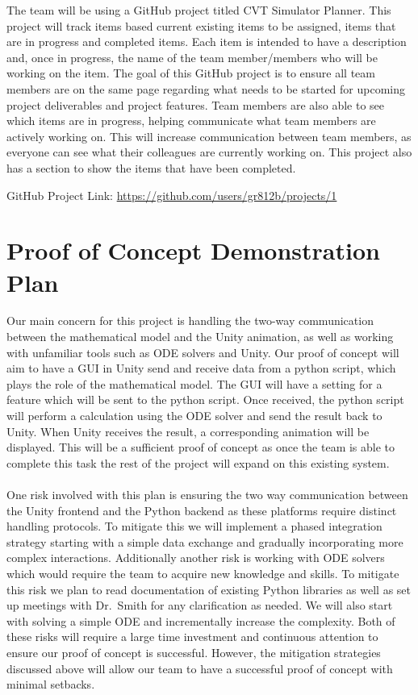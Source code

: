 \documentclass{article}
\begin{document}
The team will be using a GitHub project titled CVT Simulator Planner. 
This project will track items based current existing items to be assigned, items that are in progress and completed items. Each item is intended to have a description and, once in progress, the name of the team member/members who will be working on the item.
The goal of this GitHub project is to ensure all team members are on the same page regarding what needs to be started for upcoming project deliverables and project features. 
Team members are also able to see which items are in progress, helping communicate what team members are actively working on.
This will increase communication between team members, as everyone can see what their colleagues are currently working on.
This project also has a section to show the items that have been completed. 

\noindent GitHub Project Link: \url{https://github.com/users/gr812b/projects/1}

\section{Proof of Concept Demonstration Plan}

Our main concern for this project is handling the two-way communication between the mathematical model and the Unity animation, as well as working with unfamiliar tools such as ODE solvers and Unity.
Our proof of concept will aim to have a GUI in Unity send and receive data from a python script, which plays the role of the mathematical model.
The GUI will have a setting for a feature which will be sent to the python script. 
Once received, the python script will perform a calculation using the ODE solver and send the result back to Unity.
When Unity receives the result, a corresponding animation will be displayed.
This will be a sufficient proof of concept as once the team is able to complete this task the rest of the project will expand on this existing system. 
\\\\
\noindent One risk involved with this plan is ensuring the two way communication between the Unity frontend and the Python backend as these platforms require distinct handling protocols. 
To mitigate this we will implement a phased integration strategy starting with a simple data exchange and gradually incorporating more complex interactions. 
Additionally another risk is working with ODE solvers which would require the team to acquire new knowledge and skills.
To mitigate this risk we plan to read documentation of existing Python libraries as well as set up meetings with Dr.\ Smith for any clarification as needed. 
We will also start with solving a simple ODE and incrementally increase the complexity.
Both of these risks will require a large time investment and continuous attention to ensure our proof of concept is successful. 
However, the mitigation strategies discussed above will allow our team to have a successful proof of concept with minimal setbacks. 
\end{document}
